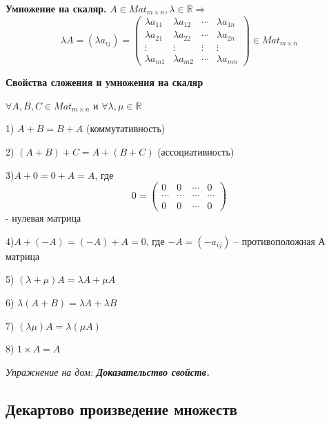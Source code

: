 \textbf{Умножение на скаляр.} $A \in Mat_{m\times n}, \lambda \in \mathbb{R} \Rightarrow$
\[ \lambda A = (\lambda a_{ij}) = 
\begin{pmatrix}
		\lambda a_{11} & \lambda a_{12} & \cdots & \lambda a_{1n} \\
		\lambda a_{21} & \lambda a_{22} & \cdots & \lambda a_{2n} \\
       \vdots & \vdots & \vdots& \vdots \\ 
       \lambda a_{m1} & \lambda a_{m2} & \cdots & \lambda a_{mn}
\end{pmatrix} \in Mat_{m\times n}
\]

\vspace{\baselineskip}
\textbf{Свойства сложения и умножения на скаляр}

$\forall A, B, C \in Mat_{m\times n}$ и $\forall \lambda, \mu \in \mathbb{R}$

1) $A + B = B + A$ (коммутативность)

2) $(A + B) + C = A + (B + C)$ (ассоциативность)

3)$A + 0 = 0 + A = A$, где \[0 = \begin{pmatrix}
0 & 0 & \cdots & 0 \\
\cdots & \cdots & \cdots & \cdots \\
0 & 0 & \cdots & 0
\end{pmatrix} \] - нулевая матрица

4)$A + (-A) = (-A) + A = 0$, где $-A = (-a_{ij})$ -- противоположная А матрица 

5) $(\lambda + \mu)A = \lambda A + \mu A$

6) $\lambda (A + B) = \lambda A + \lambda B$

7) $(\lambda \mu) A = \lambda (\mu A)$

8) $1 \times A = A$

\vspace{\baselineskip}
\textit{Упражнение на дом:} \textbf{\textit{Доказательство свойств.}}

\vspace{\baselineskip}
\begin{comment}
	Свойства (1)-(8) означают, что $Mat_{m\times n}$ является             векторным пространством.
\end{comment}

\vspace{\baselineskip}
\subsection{Декартово произведение множеств}

